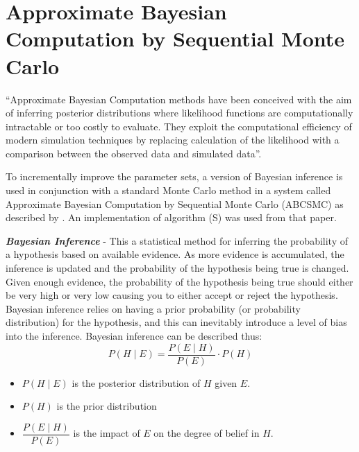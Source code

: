 \section{Approximate Bayesian Computation by Sequential Monte Carlo}

``Approximate Bayesian Computation methods have been conceived with the aim of inferring posterior distributions where likelihood functions are computationally intractable or too costly to evaluate. They exploit the computational efficiency of modern simulation techniques by replacing calculation of the likelihood with a comparison between the observed data and simulated data''\cite{Toni2009}.

To incrementally improve the parameter sets, a version of Bayesian inference is used in conjunction with a standard Monte Carlo method in a system called Approximate Bayesian Computation by Sequential Monte Carlo (ABCSMC) as described by \citet{Toni2009}. An implementation of algorithm (S) was used from that paper.

\textbf{\textit{Bayesian Inference}} - This a statistical method for inferring the probability of a hypothesis based on available evidence. As more evidence is accumulated, the inference is updated and the probability of the hypothesis being true is changed. Given enough evidence, the probability of the hypothesis being true should either be very high or very low causing you to either accept or reject the hypothesis. Bayesian inference relies on having a prior probability (or probability distribution) for the hypothesis, and this can inevitably introduce a level of bias into the inference.
Bayesian inference can be described thus:
\begin{equation}
P(H\mid E) = \dfrac{P(E\mid H)}{P(E)}\cdot P(H)
\label{eq:bayes}
\end{equation}
\begin{itemize}
	\item $P(H\mid E)$ is the posterior distribution of $H$ given $E$.
	\item $P(H)$ is the prior distribution
	\item $\dfrac{P(E\mid H)}{P(E)}$ is the impact of $E$ on the degree of belief in $H$.
\end{itemize}

